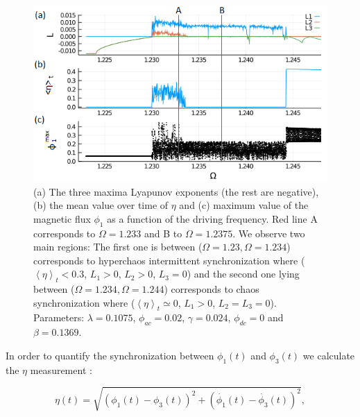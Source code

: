 \documentclass[aps,pre,reprint,groupedaddress]{revtex4-1}
\begin{document}
\begin{figure}
	\includegraphics[scale=0.8]{Fig01}
	\caption{(a) The three maxima Lyapunov exponents (the rest are negative), (b) the mean value over time of $\eta$ and (c) maximum value of the magnetic flux $\phi_{1}$ as a function of the driving frequency. Red line A corresponds to $\Omega = 1.233$ and B to $\Omega = 1.2375$. We observe two main regions: The first one is between ($\Omega=1.23,\Omega=1.234$) corresponds to hyperchaos intermittent synchronization where ($\left\langle \eta\right\rangle _{t} < 0.3$, $L_{1} > 0$, $L_{2} > 0$, $L_{3} = 0$) and the second one lying between ($\Omega=1.234,\Omega=1.244$) corresponds to chaos synchronization where ($\left\langle \eta\right\rangle _{t} \simeq 0$, $L_{1} > 0$, $L_{2} =L_{3} = 0$). Parameters: $\lambda=0.1075$, $\phi_{ac}=0.02$, $\gamma=0.024$, $\phi_{dc}=0$ and $\beta=0.1369$.} \label{fig01}
\end{figure} 

In order to quantify the synchronization between $\phi_{1}(t)$ and $\phi_{3}(t)$ we calculate the $\eta$ measurement \cite{Baker1998}:

\begin{equation} \label{}
\eta(t) =\sqrt{ (\phi_{1}(t)-\phi_{3}(t))^{2} + (\dot{\phi_{1}}(t)- \dot{\phi_{3}}(t))^{2} }, 
\end{equation}
\end{document}
